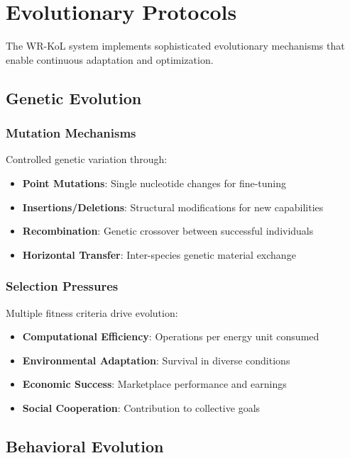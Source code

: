 \documentclass[11pt,a4paper]{article}
\begin{document}
\section{Evolutionary Protocols}

The WR-KoL system implements sophisticated evolutionary mechanisms that enable continuous adaptation and optimization.

\subsection{Genetic Evolution}

\subsubsection{Mutation Mechanisms}
Controlled genetic variation through:
\begin{itemize}
    \item \textbf{Point Mutations}: Single nucleotide changes for fine-tuning
    \item \textbf{Insertions/Deletions}: Structural modifications for new capabilities
    \item \textbf{Recombination}: Genetic crossover between successful individuals
    \item \textbf{Horizontal Transfer}: Inter-species genetic material exchange
\end{itemize}

\subsubsection{Selection Pressures}
Multiple fitness criteria drive evolution:
\begin{itemize}
    \item \textbf{Computational Efficiency}: Operations per energy unit consumed
    \item \textbf{Environmental Adaptation}: Survival in diverse conditions
    \item \textbf{Economic Success}: Marketplace performance and earnings
    \item \textbf{Social Cooperation}: Contribution to collective goals
\end{itemize}

\subsection{Behavioral Evolution}
\end{document}
